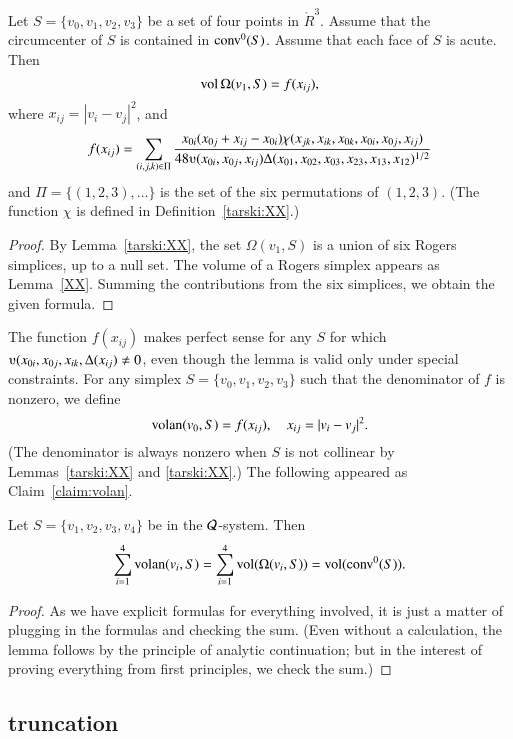 
\begin{lemma}  Let $S = \{v_0,v_1,v_2,v_3\}$ be a set of four points in $\ring{R}^3$.
Assume that the circumcenter of $S$ is contained in ${\operatorname{conv}}^0(S)$.  Assume
that each face of $S$ is acute.
Then 
  $$
  {\operatorname{vol}}\,\Omega(v_1,S) = f(x_{ij}),
  $$ 
where $x_{ij} = |v_i-v_j|^2$, and
$$
   f(x_{ij}) = \sum_{(i,j,k)\in \Pi} \frac{x_{0i} (x_{0j}+x_{ij}-x_{0i})\chi(x_{jk},x_{ik},x_{0k},x_{0i},x_{0j},x_{ij})}
   {48\ups(x_{0i},x_{0j},x_{ij})\Delta(x_{01},x_{02},x_{03},x_{23},x_{13},x_{12})^{1/2}}
$$
and $\Pi = \{(1,2,3),\ldots\}$ is the set of the six permutations of $(1,2,3)$.
(The function $\chi$ is defined in Definition~\ref{tarski:XX}.)
\end{lemma}

\begin{proof} By Lemma~\ref{tarski:XX}, the set $\Omega(v_1,S)$ is a union of
six Rogers simplices, up to a null set.  The volume of a Rogers simplex appears
as Lemma~\ref{XX}.  Summing the contributions from the six simplices, we obtain
the given formula.
\end{proof}

The function $f(x_{ij})$ makes perfect sense for any $S$ for which $\ups(x_{0i},x_{0j},x_{ik},\Delta(x_{ij})\ne 0$,
even though the lemma is valid only under special constraints.
For any simplex $S=\{v_0,v_1,v_2,v_3\}$ such that the denominator of $f$ is nonzero, we define
$$
{\operatorname{volan}}(v_0,S) = f(x_{ij}),\quad x_{ij} = |v_i-v_j|^2.
$$  
(The denominator is always nonzero when $S$ is not collinear by Lemmas~\ref{tarski:XX} and \ref{tarski:XX}.)
The following appeared as Claim~\ref{claim:volan}.

\begin{lemma}  %
Let $S=\{v_1,v_2,v_3,v_4\}$ be in the ${\mathcal Q}$-system. Then
    $$
    \sum_{i=1}^4 {\operatorname{volan}}(v_i,S) = \sum_{i=1}^4
    {\operatorname{vol}}(\Omega(v_i,S)) = {\operatorname{vol}}({\operatorname{conv}}^0(S)).
    $$
\end{lemma}

\begin{proof} As we have explicit formulas for everything involved,
it is just a matter of plugging in the formulas and checking the sum.
(Even without a calculation, the lemma follows by the principle of analytic continuation;
but in the interest of proving everything from first principles, we
check the sum.)
\end{proof}

\subsection{truncation}


